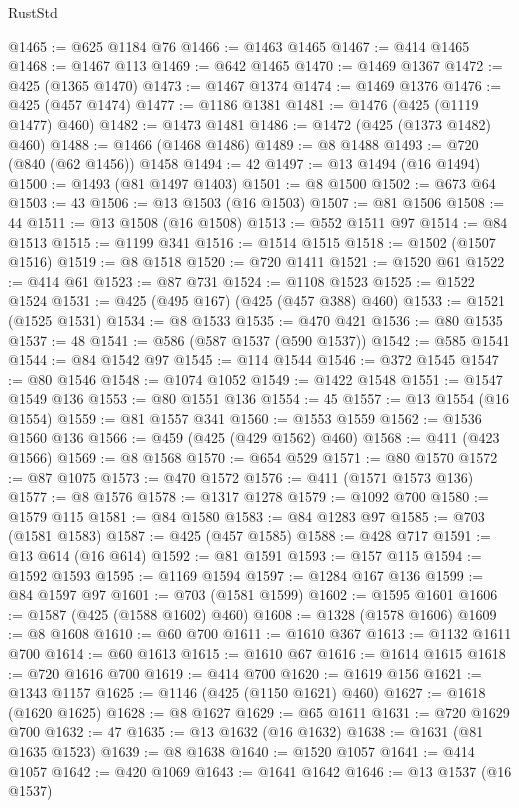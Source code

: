 \begin{lexlean}{RustStd}
\begin{coremodule}
@1465 := @625 @1184 @76
@1466 := @1463 @1465
@1467 := @414 @1465
@1468 := @1467 @113
@1469 := @642 @1465
@1470 := @1469 @1367
@1472 := @425 (@1365 @1470)
@1473 := @1467 @1374
@1474 := @1469 @1376
@1476 := @425 (@457 @1474)
@1477 := @1186 @1381
@1481 := @1476 (@425 (@1119 @1477) @460)
@1482 := @1473 @1481
@1486 := @1472 (@425 (@1373 @1482) @460)
@1488 := @1466 (@1468 @1486)
@1489 := @8 @1488
@1493 := @720 (@840 (@62 @1456)) @1458
@1494 := 42
@1497 := @13 @1494 (@16 @1494)
@1500 := @1493 (@81 @1497 @1403)
@1501 := @8 @1500
@1502 := @673 @64
@1503 := 43
@1506 := @13 @1503 (@16 @1503)
@1507 := @81 @1506
@1508 := 44
@1511 := @13 @1508 (@16 @1508)
@1513 := @552 @1511 @97
@1514 := @84 @1513
@1515 := @1199 @341
@1516 := @1514 @1515
@1518 := @1502 (@1507 @1516)
@1519 := @8 @1518
@1520 := @720 @1411
@1521 := @1520 @61
@1522 := @414 @61
@1523 := @87 @731
@1524 := @1108 @1523
@1525 := @1522 @1524
@1531 := @425 (@495 @167) (@425 (@457 @388) @460)
@1533 := @1521 (@1525 @1531)
@1534 := @8 @1533
@1535 := @470 @421
@1536 := @80 @1535
@1537 := 48
@1541 := @586 (@587 @1537 (@590 @1537))
@1542 := @585 @1541
@1544 := @84 @1542 @97
@1545 := @114 @1544
@1546 := @372 @1545
@1547 := @80 @1546
@1548 := @1074 @1052
@1549 := @1422 @1548
@1551 := @1547 @1549 @136
@1553 := @80 @1551 @136
@1554 := 45
@1557 := @13 @1554 (@16 @1554)
@1559 := @81 @1557 @341
@1560 := @1553 @1559
@1562 := @1536 @1560 @136
@1566 := @459 (@425 (@429 @1562) @460)
@1568 := @411 (@423 @1566)
@1569 := @8 @1568
@1570 := @654 @529
@1571 := @80 @1570
@1572 := @87 @1075
@1573 := @470 @1572
@1576 := @411 (@1571 @1573 @136)
@1577 := @8 @1576
@1578 := @1317 @1278
@1579 := @1092 @700
@1580 := @1579 @115
@1581 := @84 @1580
@1583 := @84 @1283 @97
@1585 := @703 (@1581 @1583)
@1587 := @425 (@457 @1585)
@1588 := @428 @717
@1591 := @13 @614 (@16 @614)
@1592 := @81 @1591
@1593 := @157 @115
@1594 := @1592 @1593
@1595 := @1169 @1594
@1597 := @1284 @167 @136
@1599 := @84 @1597 @97
@1601 := @703 (@1581 @1599)
@1602 := @1595 @1601
@1606 := @1587 (@425 (@1588 @1602) @460)
@1608 := @1328 (@1578 @1606)
@1609 := @8 @1608
@1610 := @60 @700
@1611 := @1610 @367
@1613 := @1132 @1611 @700
@1614 := @60 @1613
@1615 := @1610 @67
@1616 := @1614 @1615
@1618 := @720 @1616 @700
@1619 := @414 @700
@1620 := @1619 @156
@1621 := @1343 @1157
@1625 := @1146 (@425 (@1150 @1621) @460)
@1627 := @1618 (@1620 @1625)
@1628 := @8 @1627
@1629 := @65 @1611
@1631 := @720 @1629 @700
@1632 := 47
@1635 := @13 @1632 (@16 @1632)
@1638 := @1631 (@81 @1635 @1523)
@1639 := @8 @1638
@1640 := @1520 @1057
@1641 := @414 @1057
@1642 := @420 @1069
@1643 := @1641 @1642
@1646 := @13 @1537 (@16 @1537)

\end{coremodule}
\end{lexlean}
